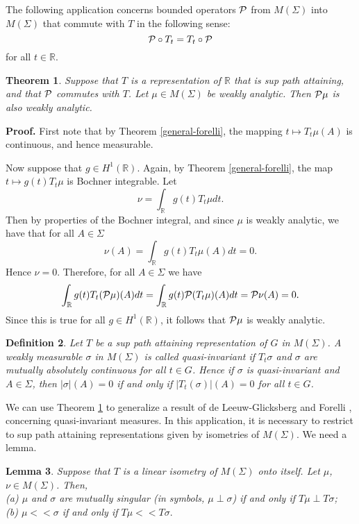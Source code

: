 \documentclass[12pt]{article}
\newcommand{\R}{\mathbb R}
\newcommand{\cP}{{\cal P}}
\newtheorem{defin}{Definition}[section]
\newtheorem{thm}[defin]{Theorem}
\newtheorem{lemma}[defin]{Lemma}
\begin{document}
The following application concerns bounded operators $\cP$
from $M(\Sigma)$ into $M(\Sigma)$
that commute with $T$ in the following sense:
$$\cP\circ T_t=T_t\circ \cP$$
for all $t\in \R$.  
\begin{thm}
Suppose that $T$ is a representation of $\R$ that is sup path
attaining,
and that $\cP$ commutes with $T$.
Let $\mu\in M(\Sigma)$ be weakly analytic.
Then $\cP \mu$ is also weakly analytic.
\label{aboutPforR}
\end{thm}
{\bf Proof.}  
First note that by Theorem \ref{general-forelli}, the mapping
$t\mapsto T_t \mu(A)$
is continuous, and hence measurable.  

Now suppose that $g \in H^1(\R)$.  Again, by Theorem \ref{general-forelli},
the
map $t\mapsto g(t) T_t\mu$ is Bochner integrable.
Let
$$ \nu = \int_\R g(t) T_t \mu dt .$$
Then by properties of the Bochner integral, 
and since $\mu$ is weakly analytic, we have that
for all $A \in \Sigma$
$$ \nu(A) = \int_\R g(t) T_t\mu(A) dt = 0 .$$
Hence $\nu = 0$.
Therefore, for all $A \in \Sigma$ we have
$$ \int_\R g(t) T_t(\cP\mu)(A) dt
   =
   \int_\R g(t) \cP(T_t\mu)(A) dt
   =
   \cP\nu(A) = 0. $$
Since this is true for all $g \in H^1(\R)$, it follows that
$\cP\mu$ is weakly analytic.


\begin{defin}
Let $T$ be a sup path attaining 
representation of $G$ in $M(\Sigma)$.
A weakly measurable $\sigma$ in $M(\Sigma)$ is
called quasi-invariant if 
$T_t\sigma$ and $\sigma$
are mutually absolutely continuous for all $t\in G$.  Hence
if $\sigma$ is quasi-invariant
and $A\in \Sigma$, then 
$|\sigma|(A)=0$ if and only if $|T_t(\sigma)|(A)=0$
for all $t\in G$.
\label{qi}
\end{defin}


We can use Theorem \ref{aboutPforR} to generalize a result of
de Leeuw-Glicksberg \cite{deleeuwglicksberg} 
and Forelli \cite{forelli}, concerning quasi-invariant measures.  In this application, it 
is necessary to restrict
to sup path attaining representations given by isometries of  $M(\Sigma)$.
We need a lemma.

\begin{lemma}
Suppose that $T$ is a linear isometry of $M(\Sigma)$ onto itself.
Let $\mu$, $\nu\in M(\Sigma)$.  Then,\\
(a) $\mu$ and $\sigma$ are mutually singular (in symbols, $\mu\perp\sigma$)
if and only if
$T\mu\perp T\sigma$;\\
(b)  $\mu<<\sigma$  if and only if
$T\mu<<T\sigma.$ 
\label{finallem}
\end{lemma}
\end{document}
